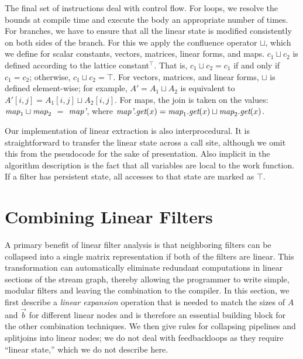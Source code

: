 \documentclass{sig-alternate}
\begin{document}
The final set of instructions deal with control flow.  For loops, we
resolve the bounds at compile time and execute the body an appropriate
number of times.  For branches, we have to ensure that all the linear
state is modified consistently on both sides of the branch.  For this
we apply the confluence operator $\sqcup$, which we define for scalar
constants, vectors, matrices, linear forms, and maps.  $c_1 \sqcup
c_2$ is defined according to the lattice constant$^{\top}$.  That is,
$c_1 \sqcup c_2 = c_1$ if and only if $c_1 = c_2$; otherwise, $c_1
\sqcup c_2 = \top$.  For vectors, matrices, and linear forms, $\sqcup$
is defined element-wise; for example, $A' = A_1 \sqcup A_2$ is
equivalent to $A'[i,j] = A_1[i,j] \sqcup A_2[i,j]$.  For maps, the
join is taken on the values: $\mbox{\it map}_1 \sqcup \mbox{\it map}_2$ $=$
$\mbox{\it map'}$, where $\mbox{\it map'}.\mbox{\it get}(x) = \mbox{\it map}_1.\mbox{\it get}(x)
\sqcup \mbox{\it map}_2.\mbox{\it get}(x)$.

Our implementation of linear extraction is also interprocedural.  It
is straightforward to transfer the linear state across a call site,
although we omit this from the pseudocode for the sake of
presentation.  Also implicit in the algorithm description is the fact
that all variables are local to the work function.  If a filter
has persistent state, all accesses to that state are marked as $\top$.


\section{Combining Linear Filters}
\label{sec:combine}

A primary benefit of linear filter analysis is that neighboring
filters can be collapsed into a single matrix representation if both
of the filters are linear.  This transformation can automatically
eliminate redundant computations in linear sections of the stream
graph, thereby allowing the programmer to write simple, modular
filters and leaving the combination to the compiler.  In this section,
we first describe a {\it linear expansion} operation that is needed to
match the sizes of $A$ and $\vec{b}$ for different linear nodes and is
therefore an essential building block for the other combination
techniques.  We then give rules for collapsing pipelines and
splitjoins into linear nodes; we do not deal with feedbackloops as
they require ``linear state,'' which we do not describe
here.
\end{document}

